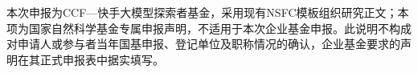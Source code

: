 \justifying
\NSFCBodyText

本次申报为CCF—快手大模型探索者基金，采用现有NSFC模板组织研究正文；本项为国家自然科学基金专属申报声明，不适用于本次企业基金申报。此说明不构成对申请人或参与者当年国基申报、登记单位及职称情况的确认，企业基金要求的声明在其正式申报表中据实填写。
